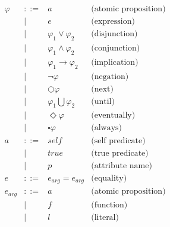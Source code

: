 \[
\begin{array}{rcll}
    \varphi     & ::=   & a                                 & \text{(atomic proposition)} \\
                & |     & e                                 & \text{(expression)} \\
                & |     & \varphi_1 \vee \varphi_2          & \text{(disjunction)} \\
                & |     & \varphi_1 \wedge \varphi_2        & \text{(conjunction)} \\
                & |     & \varphi_1 \rightarrow \varphi_2   & \text{(implication)} \\
                & |     & \neg \varphi                      & \text{(negation)} \\
                & |     & \bigcirc \varphi                  & \text{(next)} \\
                & |     & \varphi_1 \bigcup \varphi_2       & \text{(until)} \\
                & |     & \Diamond \varphi                  & \text{(eventually)} \\
                & |     & \square \varphi                   & \text{(always)} \\
    a           & ::=   & self                              & \text{(self predicate)} \\
                & |     & true                              & \text{(true predicate)} \\
                & |     & p                                 & \text{(attribute name)} \\
    e           & ::=   & e_{arg} = e_{arg}                 & \text{(equality)} \\
    e_{arg}     & ::=   & a                                 & \text{(atomic proposition)} \\
                & |     & f                                 & \text{(function)} \\
                & |     & l                                 & \text{(literal)} \\

\end{array}\]
